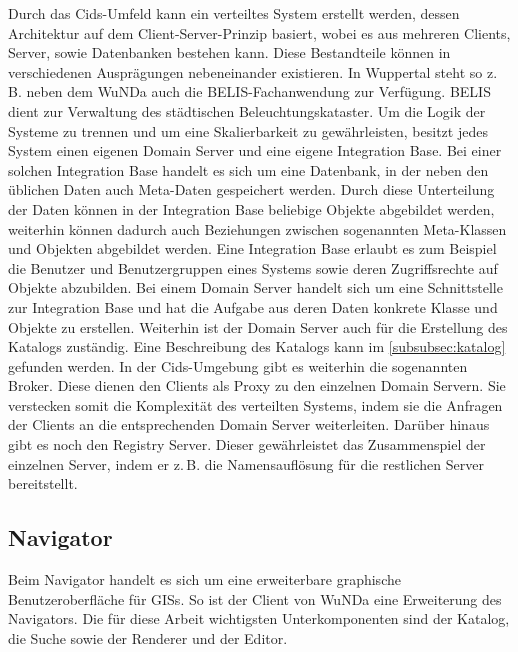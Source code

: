 Durch das Cids-Umfeld kann ein verteiltes System erstellt werden, dessen Architektur auf dem Client-Server-Prinzip basiert, wobei es aus mehreren Clients, Server, sowie Datenbanken bestehen kann.
Diese Bestandteile können in verschiedenen Ausprägungen nebeneinander existieren.
In Wuppertal steht so z.\,B. neben dem \ac{WuNDa} auch die BELIS-Fachanwendung zur Verfügung. BELIS dient zur Verwaltung des städtischen Beleuchtungskataster.
Um die Logik der Systeme zu trennen und um eine Skalierbarkeit zu gewährleisten, besitzt jedes System einen eigenen Domain Server und eine eigene Integration Base.
Bei einer solchen Integration Base handelt es sich um eine Datenbank, in der neben den üblichen Daten auch Meta-Daten gespeichert werden.
Durch diese Unterteilung der Daten können in der Integration Base beliebige Objekte abgebildet werden, weiterhin können dadurch auch Beziehungen zwischen sogenannten Meta-Klassen und Objekten abgebildet werden.
Eine Integration Base erlaubt es zum Beispiel die Benutzer und Benutzergruppen eines Systems sowie deren Zugriffsrechte auf Objekte abzubilden.
Bei einem Domain Server handelt sich um eine Schnittstelle zur Integration Base und hat die Aufgabe aus deren Daten konkrete Klasse und Objekte zu erstellen. Weiterhin ist der Domain Server auch für die Erstellung des Katalogs zuständig.
Eine Beschreibung des Katalogs kann im \autoref{subsubsec:katalog} gefunden werden.
In der Cids-Umgebung gibt es weiterhin die sogenannten Broker. Diese dienen den Clients als Proxy zu den einzelnen Domain Servern. Sie verstecken somit die Komplexität des verteilten Systems, indem sie die Anfragen der Clients an die entsprechenden Domain Server weiterleiten.
Darüber hinaus gibt es noch den Registry Server. Dieser gewährleistet das Zusammenspiel der einzelnen Server, indem er z.\,B. die Namensauflösung für die restlichen Server bereitstellt.

\subsection{Navigator}
Beim Navigator handelt es sich um eine erweiterbare graphische Benutzeroberfläche für \acp{GIS}. So ist der Client von \ac{WuNDa} eine Erweiterung des Navigators. Die für diese Arbeit wichtigsten Unterkomponenten sind der Katalog, die Suche sowie der Renderer und der Editor.

